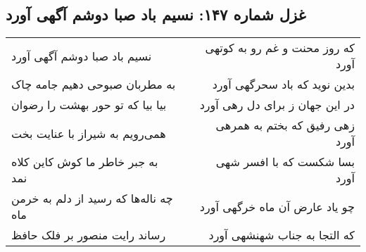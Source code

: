\begin{center}
\section*{غزل شماره ۱۴۷: نسیم باد صبا دوشم آگهی آورد}
\label{sec:sh147}
\begin{longtable}{l p{0.5cm} r}
نسیم باد صبا دوشم آگهی آورد
&&
که روز محنت و غم رو به کوتهی آورد
\\
به مطربان صبوحی دهیم جامه چاک
&&
بدین نوید که باد سحرگهی آورد
\\
بیا بیا که تو حور بهشت را رضوان
&&
در این جهان ز برای دل رهی آورد
\\
همی‌رویم به شیراز با عنایت بخت
&&
زهی رفیق که بختم به همرهی آورد
\\
به جبر خاطر ما کوش کاین کلاه نمد
&&
بسا شکست که با افسر شهی آورد
\\
چه ناله‌ها که رسید از دلم به خرمن ماه
&&
چو یاد عارض آن ماه خرگهی آورد
\\
رساند رایت منصور بر فلک حافظ
&&
که التجا به جناب شهنشهی آورد
\\
\end{longtable}
\end{center}

